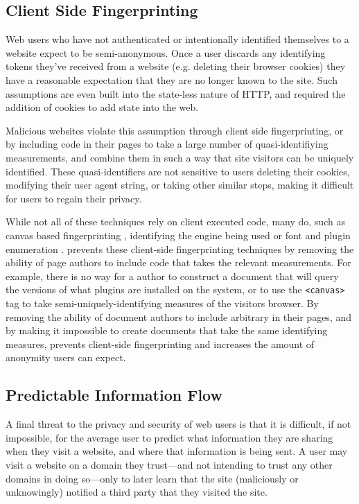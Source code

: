 \subsection{Client Side Fingerprinting}
Web users who have not authenticated or intentionally identified themselves
to a website expect to be semi-anonymous.  Once a user discards any identifying
tokens they've received from a website (e.g. deleting their
browser cookies) they have a reasonable expectation that they are no longer
known to the site.  Such assumptions are even built into the state-less nature of
HTTP, and required the addition of cookies to add state into the web.

Malicious websites violate this assumption through client side
fingerprinting, or by including \JS code in their pages to
take a large number of quasi-identifiying measurements, and combine them
in such a way that site visitors can be uniquely identified.  These
quasi-identifiers are not sensitive to users deleting their cookies,
modifying their user agent string, or taking other similar steps, making it
difficult for users to regain their privacy.

While not all of these techniques rely on client executed \JS
code, many do, such as canvas based fingerprinting
\cite{mowery2012pixel,acar2014web}, identifying the \JS
engine being used\cite{mowery2011fingerprinting} or font and plugin enumeration
\cite{eckersley2010unique}.  \CDF prevents these client-side fingerprinting
techniques by removing the ability of page authors to
include code that takes the relevant measurements.  For
example, there is no way for a \CDF author to construct a \CDF document that
will query the versions of what plugins are installed on the system, or to
use the \texttt{<canvas>} tag to take semi-uniquely-identifying measures of the
visitors browser.  By removing the ability of document authors to include
arbitrary \JS in their pages, and by making it impossible to create
documents that take the same identifying measures, \CDF prevents client-side
fingerprinting and increases the amount of anonymity users can expect.


\subsection{Predictable Information Flow}
\label{sec:eval-info-flow}
A final threat to the privacy and security of web users is that it is difficult,
if not impossible, for the average user to predict what information they are
sharing when they visit a website, and where that information is being sent.
A user may visit a website on a domain they trust---and not intending to trust
any other domains in doing so---only to later learn that the site (maliciously
or unknowingly) notified a third party that they visited the site.

